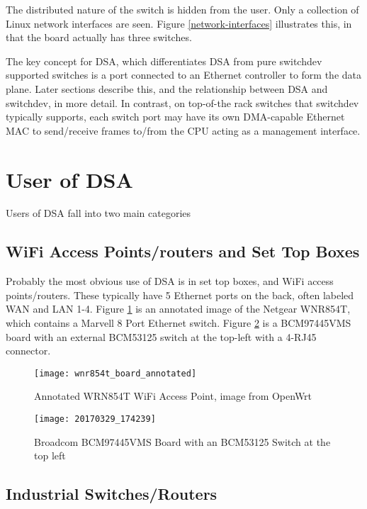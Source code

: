 \documentclass[letterpaper]{article}
\begin{document}
The distributed nature of the switch is hidden from the user. Only a
collection of Linux network interfaces are seen. Figure
\ref{network-interfaces} illustrates this, in that the board actually
has three switches.

The key concept for DSA, which differentiates DSA from pure switchdev
supported switches is a port connected to an Ethernet controller to
form the data plane. Later sections describe this, and the
relationship between DSA and switchdev, in more detail. In contrast,
on top-of-the rack switches that switchdev typically supports, each
switch port may have its own DMA-capable Ethernet MAC to send/receive
frames to/from the CPU acting as a management interface.

\section{User of DSA}

Users of DSA fall into two main categories

\subsection{WiFi Access Points/routers and Set Top Boxes}

Probably the most obvious use of DSA is in set top boxes, and WiFi
access points/routers. These typically have 5 Ethernet ports on the
back, often labeled WAN and LAN 1-4. Figure \ref{wrn854t} is an
annotated image of the Netgear WNR854T, which contains a Marvell 8
Port Ethernet switch. Figure \ref{BCM97445VMS} is a BCM97445VMS board
with an external BCM53125 switch at the top-left with a 4-RJ45
connector.

\begin{figure}[ht]
  \centering
  \texttt{[image: wnr854t\_board\_annotated]}
  \caption{Annotated WRN854T WiFi Access Point, image from OpenWrt}
  \label{wrn854t}
\end{figure}

\begin{figure}[ht]
  \centering
  \texttt{[image: 20170329\_174239]}
  \caption{Broadcom BCM97445VMS Board with an BCM53125 Switch at the top left}
  \label{BCM97445VMS}
\end{figure}

\subsection{Industrial Switches/Routers}
\end{document}
